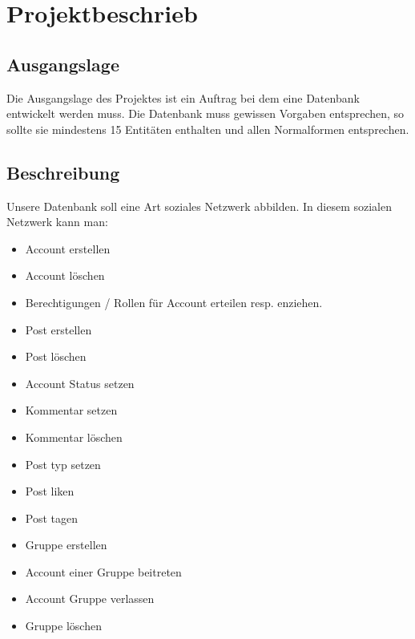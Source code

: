 \documentclass[12pt,twoside,a4paper]{article}
\title{\titleText}
\author{\authorText}
\date{\dateText}
\begin{document}
	\maketitle
	\tableofcontents
	\section {Projektbeschrieb}
	
	\subsection{Ausgangslage}
	
	Die Ausgangslage des Projektes ist ein Auftrag bei dem eine Datenbank entwickelt werden muss. Die Datenbank muss gewissen Vorgaben entsprechen, so sollte sie mindestens 15 Entitäten enthalten und allen Normalformen entsprechen.
	
	\subsection{Beschreibung}
	
	Unsere Datenbank soll eine Art soziales Netzwerk abbilden. In diesem sozialen Netzwerk kann man:
	\begin{itemize}
		\item Account erstellen
		\item Account löschen
		\item Berechtigungen / Rollen für Account erteilen resp. enziehen.
		\item Post erstellen
		\item Post löschen
		\item Account Status setzen
		\item Kommentar setzen
		\item Kommentar löschen
		\item Post typ setzen
		\item Post liken
		\item Post tagen
		\item Gruppe erstellen
		\item Account einer Gruppe beitreten
		\item Account Gruppe verlassen
		\item Gruppe löschen
		
	\end{itemize}
	
\end{document}
